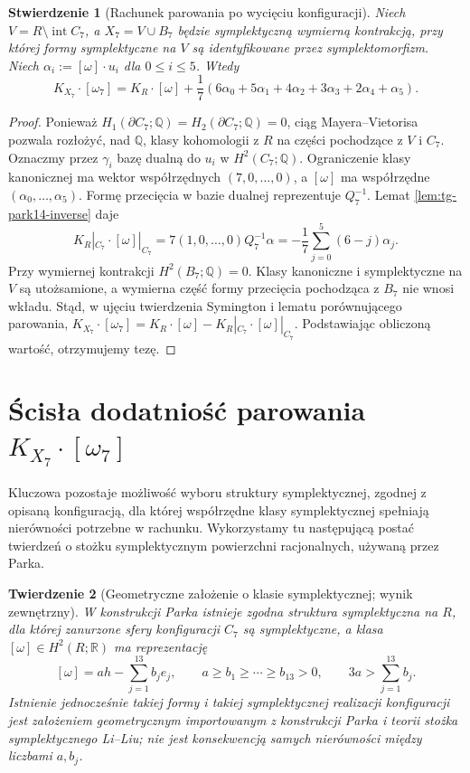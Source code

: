 \documentclass[11pt,a4paper]{report}
\numberwithin{equation}{section}
\theoremstyle{plain}
\newtheorem{twierdzenie}{Twierdzenie}[section]
\newtheorem{stwierdzenie}[twierdzenie]{Stwierdzenie}
\theoremstyle{definition}
\theoremstyle{remark}
\begin{document}
\begin{stwierdzenie}[Rachunek parowania po wycięciu konfiguracji]
\label{prop:tg-park14-splitting}
Niech $V=R\setminus\operatorname{int}C_7$,
a $X_7=V\cup B_7$ będzie symplektyczną wymierną
kontrakcją, przy której formy symplektyczne na $V$
są identyfikowane przez symplektomorfizm.
Niech $\alpha_i:=[\omega]\cdot u_i$ dla $0\le i\le5$.
Wtedy
\[
K_{X_7}\cdot[\omega_7]
 =K_R\cdot[\omega]+
   \frac17(6\alpha_0+5\alpha_1+4\alpha_2
                    +3\alpha_3+2\alpha_4+\alpha_5).
\]
\end{stwierdzenie}

\begin{proof}
Ponieważ $H_1(\partial C_7;\mathbb Q)
=H_2(\partial C_7;\mathbb Q)=0$,
ciąg Mayera--Vietorisa pozwala rozłożyć, nad $\mathbb Q$,
klasy kohomologii z $R$ na części pochodzące z $V$ i $C_7$.
Oznaczmy przez $\gamma_i$ bazę dualną do $u_i$ w
$H^2(C_7;\mathbb Q)$. Ograniczenie klasy kanonicznej ma
wektor współrzędnych $(7,0,\ldots,0)$, a $[\omega]$
ma współrzędne $(\alpha_0,\ldots,\alpha_5)$.
Formę przecięcia w bazie dualnej reprezentuje $Q_7^{-1}$.
Lemat \ref{lem:tg-park14-inverse} daje
\[
K_R|_{C_7}\cdot[\omega]|_{C_7}
  =7(1,0,\ldots,0)Q_7^{-1}\alpha
  =-\frac17\sum_{j=0}^{5}(6-j)\alpha_j.
\]
Przy wymiernej kontrakcji $H^2(B_7;\mathbb Q)=0$.
Klasy kanoniczne i symplektyczne na $V$ są utożsamione,
a wymierna część formy przecięcia pochodząca z $B_7$
nie wnosi wkładu. Stąd, w ujęciu twierdzenia
Symington i lematu porównującego parowania,
$K_{X_7}\cdot[\omega_7]
=K_R\cdot[\omega]-K_R|_{C_7}\cdot[\omega]|_{C_7}$.
Podstawiając obliczoną wartość, otrzymujemy tezę.
\end{proof}

\section{Ścisła dodatniość parowania \texorpdfstring{$K_{X_7}\cdot[\omega_7]$}{K omega}}
\label{sec:tg-park14-positivity}

Kluczowa pozostaje możliwość wyboru struktury symplektycznej,
zgodnej z opisaną konfiguracją, dla której współrzędne klasy
symplektycznej spełniają nierówności potrzebne w rachunku.
Wykorzystamy tu następującą postać twierdzeń o stożku
symplektycznym powierzchni racjonalnych, używaną przez Parka.

\begin{twierdzenie}[Geometryczne założenie o klasie symplektycznej; wynik zewnętrzny]
\label{thm:tg-park14-cone}
W konstrukcji Parka istnieje zgodna struktura symplektyczna
na $R$, dla której zanurzone sfery konfiguracji $C_7$
są symplektyczne, a klasa $[\omega]\in H^2(R;\mathbb R)$
ma reprezentację
\[
[\omega]=a h-\sum_{j=1}^{13}b_j e_j,
\qquad
 a\ge b_1\ge\cdots\ge b_{13}>0,
\qquad 3a>\sum_{j=1}^{13}b_j.
\]
Istnienie jednocześnie takiej formy i takiej symplektycznej
realizacji konfiguracji jest założeniem geometrycznym
importowanym z konstrukcji Parka i teorii stożka
symplektycznego Li--Liu; nie jest konsekwencją
samych nierówności między liczbami $a,b_j$.
\end{twierdzenie}
\end{document}
